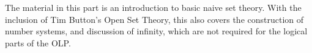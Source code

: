 \documentclass[../../include/open-logic-part]{subfiles}
\begin{document}

\begin{editorial}
  The material in this part is an introduction to basic naive set
  theory. With the inclusion of Tim Button's Open Set Theory, this
  also covers the construction of number systems, and discussion of
  infinity, which are not required for the logical parts of the OLP.
\end{editorial}







\OLEndPartHook
\end{document}
